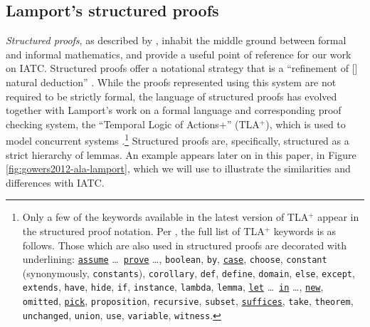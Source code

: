 \documentclass[smallextended,oneside]{svjour3}       %
\let\cite\citep
\newcommand\nothing[1]{#1}
\let\thesis\nothing
\begin{document}
\subsection{Lamport's structured proofs} \label{sec:structured-proofs}

\thesis{\emph{Structured proofs}, as described by
  \citet{lamport1995write,lamport2012write21st}, inhabit the middle
  ground between formal and informal mathematics, and
provide a useful point of reference for our work on IATC.}
Structured proofs offer a notational strategy that is a ``refinement
of [\lips] natural deduction'' \cite{lamport1995write}.  While the
proofs represented using this system are not required to be strictly
formal, the language of structured proofs has evolved together with
Lamport's work on a formal language and corresponding proof checking
system, the ``Temporal Logic of Actions+'' ({TLA}$^{+}$), which is used
to model concurrent systems
\cite{lamport1999specifying,lamport2014tla2}.\footnote{Only a few
  of the keywords available in the latest version of
  TLA\(^{+}\) appear in the structured proof notation.  Per
  \citet{lamport2015tlahyperbook}, the full list of TLA\(^{+}\)
  keywords is as follows.  Those which are also used in structured
  proofs are decorated with underlining: \uline{\texttt{assume}}
  \ldots\ \uline{\texttt{prove}} \ldots, \texttt{boolean},
  \texttt{by}, \uline{\texttt{case}}, \texttt{choose},
  \texttt{constant} (synonymously, \texttt{constants}),
  \texttt{corollary}, \texttt{def}, \texttt{define}, \texttt{domain},
  \texttt{else}, \texttt{except}, \texttt{extends}, \texttt{have},
  \texttt{hide}, \texttt{if}, \texttt{instance}, \texttt{lambda},
  \texttt{lemma}, \uline{\texttt{let}} \ldots\ \uline{\texttt{in}}
  \ldots, \uline{\texttt{new}}, \texttt{omitted},
  \uline{\texttt{pick}}, \texttt{proposition}, \texttt{recursive},
  \texttt{subset}, \uline{\texttt{suffices}}, \texttt{take},
  \texttt{theorem}, \texttt{unchanged}, \texttt{union}, \texttt{use},
  \texttt{variable}, \texttt{witness}.}  Structured proofs are,
specifically, structured as a strict hierarchy of lemmas.
An example appears later on in this paper, in Figure \ref{fig:gowers2012-ala-lamport},
which we will use to illustrate the similarities and differences with
IATC.
\end{document}
